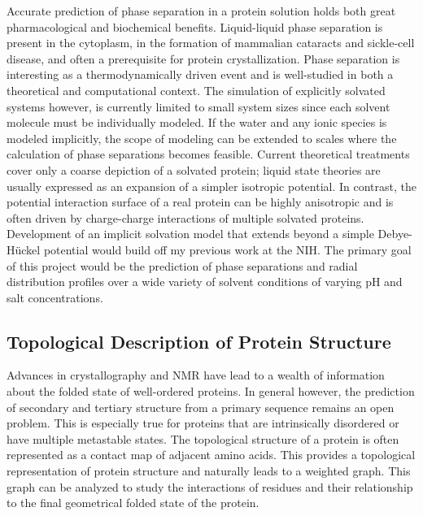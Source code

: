 \documentclass[]{scrartcl}
\newcommand{\insetpicture}[1]{\marginpar{\texttt{[image: \#1]}}}
\begin{document}
\begin{cleanCV}
Accurate prediction of phase separation in a protein solution holds both great pharmacological and biochemical benefits.
Liquid-liquid phase separation is present in the cytoplasm, in the formation of mammalian cataracts and sickle-cell disease, and often a prerequisite for protein crystallization.
Phase separation is interesting as a thermodynamically driven event and is well-studied in both a theoretical and computational context.
The simulation of explicitly solvated systems however, is currently limited to small system sizes since each solvent molecule must be individually modeled.
\insetpicture{research_images/macrocharge_lysozyme}
If the water and any ionic species is modeled implicitly, the scope of modeling can be extended to scales where the calculation of phase separations becomes feasible.
Current theoretical treatments cover only a coarse depiction of a solvated protein; liquid state theories are usually expressed as an expansion of a simpler isotropic potential.
In contrast, the potential interaction surface of a real protein can be highly anisotropic and is often driven by charge-charge interactions of multiple solvated proteins.
Development of an implicit solvation model that extends beyond a simple Debye-H\"{u}ckel potential would build off my previous work at the NIH.
The primary goal of this project would be the prediction of phase separations and radial distribution profiles over a wide variety of solvent conditions of varying pH and salt concentrations. 


\subsection{Topological Description of Protein Structure}

Advances in crystallography and NMR have lead to a wealth of information about the folded state of well-ordered proteins.
In general however, the prediction of secondary and tertiary structure from a primary sequence remains an open problem.
\insetpicture{research_images/3d_example_graph.png}
This is especially true for proteins that are intrinsically disordered or have multiple metastable states.
The topological structure of a protein is often represented as a contact map of adjacent amino acids.
This provides a topological representation of protein structure and naturally leads to a weighted graph.
This graph can be analyzed to study the interactions of residues and their relationship to the final geometrical folded state of the protein.


\end{cleanCV}
\end{document}
